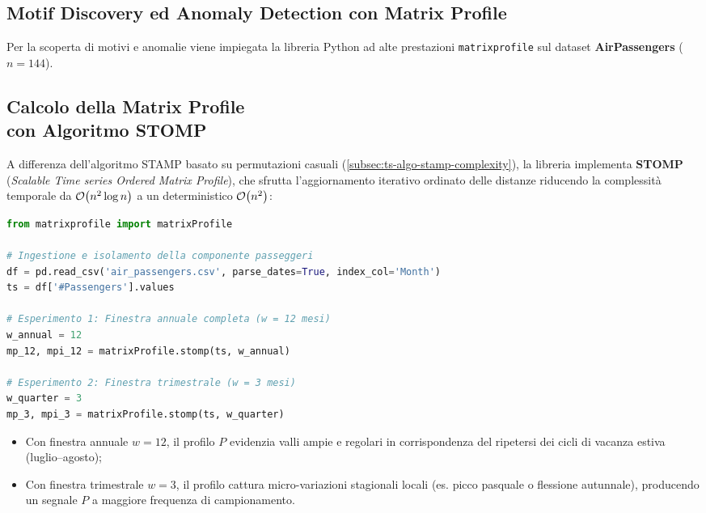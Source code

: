 \FloatBarrier
\subsection{Motif Discovery ed Anomaly Detection con Matrix Profile}
\label{sec:ts-lab-motif-matrixprofile}

Per la scoperta di motivi e anomalie viene impiegata la libreria Python ad alte prestazioni \texttt{matrixprofile} sul dataset \textbf{AirPassengers} ($n = 144$).

\FloatBarrier
\subsection[Calcolo della Matrix Profile con Algoritmo STOMP]{Calcolo della Matrix Profile\\con Algoritmo STOMP}
\label{subsec:ts-lab-stomp-computation}

A differenza dell'algoritmo STAMP basato su permutazioni casuali (\autoref{subsec:ts-algo-stamp-complexity}), la libreria implementa \textbf{STOMP} (\textit{Scalable Time series Ordered Matrix Profile}), che sfrutta l'aggiornamento iterativo ordinato delle distanze riducendo la complessit\`a temporale da $\mathcal{O}\!\left(n^2 \log n\right)$ a un deterministico $\mathcal{O}\!\left(n^2\right)$:

\begin{lstlisting}[language=Python, style=code]
from matrixprofile import matrixProfile

# Ingestione e isolamento della componente passeggeri
df = pd.read_csv('air_passengers.csv', parse_dates=True, index_col='Month')
ts = df['#Passengers'].values

# Esperimento 1: Finestra annuale completa (w = 12 mesi)
w_annual = 12
mp_12, mpi_12 = matrixProfile.stomp(ts, w_annual)

# Esperimento 2: Finestra trimestrale (w = 3 mesi)
w_quarter = 3
mp_3, mpi_3 = matrixProfile.stomp(ts, w_quarter)
\end{lstlisting}

\begin{remark}[Confronto Funzionale tra le Finestre $w=12$ e $w=3$]
\begin{itemize}
    \item Con finestra annuale $w = 12$, il profilo $P$ evidenzia valli ampie e regolari in corrispondenza del ripetersi dei cicli di vacanza estiva (luglio--agosto);
    \item Con finestra trimestrale $w = 3$, il profilo cattura micro-variazioni stagionali locali (es. picco pasquale o flessione autunnale), producendo un segnale $P$ a maggiore frequenza di campionamento.
\end{itemize}
\end{remark}

